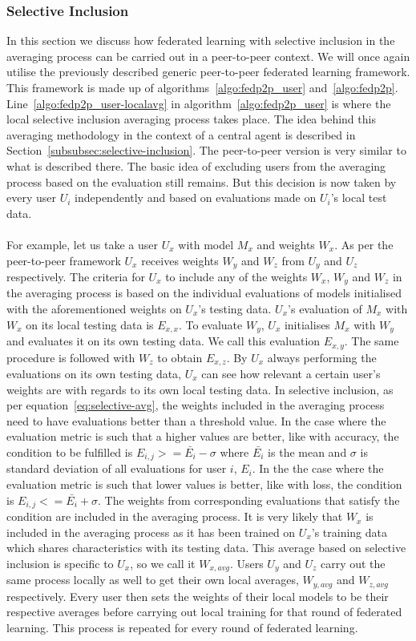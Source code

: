 \documentclass[12pt]{article}
\begin{document}
\subsubsection{Selective Inclusion}
In this section we discuss how federated learning with selective inclusion in the averaging process can be carried out in a peer-to-peer context. We will once again utilise the previously described generic peer-to-peer federated learning framework. This framework is made up of algorithms~\ref{algo:fedp2p_user} and~\ref{algo:fedp2p}. Line~\ref{algo:fedp2p_user-localavg} in algorithm~\ref{algo:fedp2p_user} is where the local selective inclusion averaging process takes place. The idea behind this averaging methodology in the context of a central agent is described in Section~\ref{subsubsec:selective-inclusion}. The peer-to-peer version is very similar to what is described there. The basic idea of excluding users from the averaging process based on the evaluation still remains. But this decision is now taken by every user $U_i$ independently and based on evaluations made on $U_i$'s local test data.
\\\\
For example, let us take a user $U_x$ with model $M_x$ and weights $W_x$. As per the peer-to-peer framework $U_x$ receives weights $W_y$ and $W_z$ from $U_y$ and $U_z$ respectively. The criteria for $U_x$ to include any of the weights $W_x$, $W_y$ and $W_z$ in the averaging process is based on the individual evaluations of models initialised with the aforementioned weights on $U_x$'s testing data. $U_x$'s evaluation of $M_x$ with $W_x$ on its local testing data is $E_{x,x}$. To evaluate $W_y$, $U_x$ initialises $M_x$ with $W_y$ and evaluates it on its own testing data. We call this evaluation $E_{x,y}$. The same procedure is followed with $W_z$ to obtain $E_{x,z}$. By $U_x$ always performing the evaluations on its own testing data, $U_x$ can see how relevant a certain user's weights are with regards to its own local testing data. In selective inclusion, as per equation~\ref{eq:selective-avg}, the weights included in the averaging process need to have evaluations better than a threshold value. In the case where the evaluation metric is such that a higher values are better, like with accuracy, the condition to be fulfilled is $E_{i,j} >= \bar{E_i}-\sigma$ where $\bar{E_i}$ is the mean and $\sigma$ is standard deviation of all evaluations for user $i$, $E_i$. In the the case where the evaluation metric is such that lower values is better, like with loss, the condition is $E_{i,j} <= \bar{E_i}+\sigma$. The weights from corresponding evaluations that satisfy the condition are included in the averaging process. It is very likely that $W_x$ is included in the averaging process as it has been trained on $U_x$'s training data which shares characteristics with its testing data. This average based on selective inclusion is specific to $U_x$, so we call it $W_{x,avg}$. Users $U_y$ and $U_z$ carry out the same process locally as well to get their own local averages, $W_{y,avg}$ and $W_{z,avg}$ respectively. Every user then sets the weights of their local models to be their respective averages before carrying out local training for that round of federated learning. This process is repeated for every round of federated learning.
\end{document}
